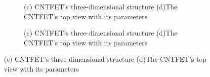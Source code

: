 
\begin{figure}[htbp]
  \centering
  \begin{subfigure}[b]{0.48\linewidth}
    \centering
    \caption{(c) CNTFET's three-dimensional structure (d)The CNTFET's top view with its parameters}

  \end{subfigure}
  \hfill
  \begin{subfigure}[b]{0.48\linewidth}
    \centering
    \caption{(c) CNTFET's three-dimensional structure (d)The CNTFET's top view with its parameters}

  \end{subfigure}
  \caption{(c) CNTFET's three-dimensional structure (d)The CNTFET's top view with its parameters}

  \label{fig:group_yk4t5}
\end{figure}
